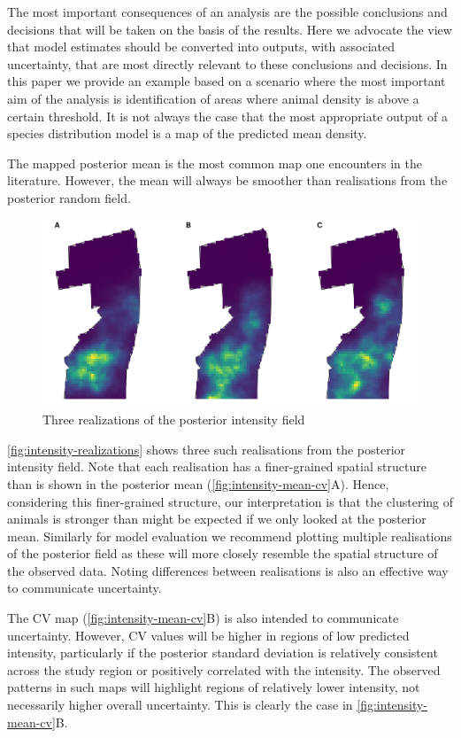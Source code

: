 \documentclass{stylefile16/statsoc}
\begin{document}
The most important consequences of an analysis are the possible conclusions and decisions that will be taken on the basis of the results.  Here we advocate the view that model estimates should be converted into outputs, with associated uncertainty, that are most directly relevant to these conclusions and decisions.  In this paper we provide an example based on a scenario where the most important aim of the analysis is identification of areas where animal density is above a certain threshold.  It is not always the case that the most appropriate output of a species distribution model is a map of the predicted mean density.

The mapped posterior mean is the most common map one encounters in the literature.  However, the mean will always be smoother than realisations from the posterior random field.
\begin{figure}
	\includegraphics[scale=0.525]{figures/intensity_realized.png}
	\caption{Three realizations of the posterior intensity field}
	\label{fig:intensity-realizations}
\end{figure}
\autoref{fig:intensity-realizations} shows three such realisations from the posterior intensity field.  Note that each realisation has a finer-grained spatial structure than is shown in the posterior mean (\autoref{fig:intensity-mean-cv}A).  Hence, considering this finer-grained structure, our interpretation is that the clustering of animals is stronger than might be expected if we only looked at the posterior mean.  Similarly for model evaluation we recommend plotting multiple realisations of the posterior field as these will more closely resemble the spatial structure of the observed data.  Noting differences between realisations is also an effective way to communicate uncertainty.

The CV map (\autoref{fig:intensity-mean-cv}B) is also intended to communicate uncertainty.  However, CV values will be higher in regions of low predicted intensity, particularly if the posterior standard deviation is relatively consistent across the study region or positively correlated with the intensity.  The observed patterns in such maps will highlight regions of relatively lower intensity, not necessarily higher overall uncertainty.  This is clearly the case in \autoref{fig:intensity-mean-cv}B.
\end{document}
